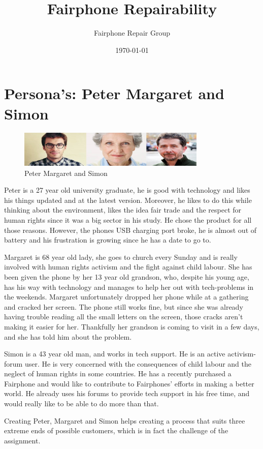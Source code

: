 \documentclass[final,a4paper]{report} %
\author{Fairphone Repair Group}
\title{Fairphone Repairability}
\date{\today}
\begin{document}
	\section{Persona's: Peter Margaret and Simon}
	\label{sec:storyboard-personas}
	
	\begin{figure}[H]
		\centering
		\includegraphics[width=0.8\textwidth]{resources/PMS}
		\caption{Peter Margaret and Simon}
		\label{fig:PMS}
	\end{figure}
	
	Peter is a 27 year old university graduate, he is good with technology and likes his things updated and at the latest version. Moreover, he likes to do this while thinking about the environment, likes the idea fair trade and the respect for human rights since it was a big sector in his study. He chose the product for all those reasons. However, the phones USB charging port broke, he is almost out of battery and his frustration is growing since he has a date to go to. 
	
	Margaret is 68 year old lady, she goes to church every Sunday and is really involved with human rights activism and the fight against child labour. She has been given the phone by her 13 year old grandson, who, despite his young age, has his way with technology and manages to help her out with tech-problems in the weekends. Margaret unfortunately dropped her phone while at a gathering and cracked her screen. The phone still works fine, but since she was already having trouble reading all the small letters on the screen, those cracks aren't making it easier for her. Thankfully her grandson is coming to visit in a few days, and she has told him about the problem.
	
	Simon is a 43 year old man, and works in tech support. He is an active activism-forum user. He is very concerned with the consequences of child labour and the neglect of human rights in some countries. He has a recently purchased a Fairphone and would like to contribute to Fairphones' efforts in making a better world. He already uses his forums to provide tech support in his free time, and would really like to be able to do more than that.
	
	Creating Peter, Margaret and Simon helps creating a process that suits three extreme ends of possible customers, which is in fact the challenge of the assignment. 
\end{document}
